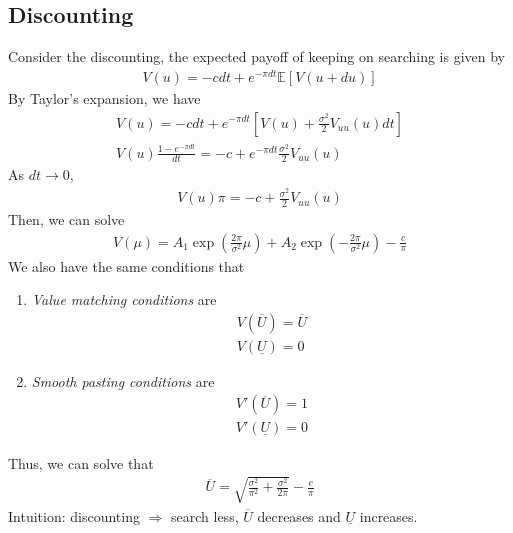\documentclass[11pt]{elegantbook}
\begin{document}
\subsection{Discounting}
Consider the discounting, the expected payoff of keeping on searching is given by
\begin{equation}
    \begin{aligned}
        V(u)=-cdt+e^{-\pi dt}\mathbb{E}[V(u+du)]
    \end{aligned}
    \nonumber
\end{equation}
By Taylor's expansion, we have
\begin{equation}
    \begin{aligned}
        V(u)=-cdt+e^{-\pi dt}[V(u)+\frac{\sigma^2}{2}V_{uu}(u)dt]\\
        V(u)\frac{1-e^{-\pi dt}}{dt}=-c+e^{-\pi dt}\frac{\sigma^2}{2}V_{uu}(u)
    \end{aligned}
    \nonumber
\end{equation}
As $dt \rightarrow 0$,
\begin{equation}
    \begin{aligned}
        V(u)\pi=-c+\frac{\sigma^2}{2}V_{uu}(u)
    \end{aligned}
    \nonumber
\end{equation}
Then, we can solve
\begin{equation}
    \begin{aligned}
        V(\mu)=A_1\exp\left(\frac{2\pi}{\sigma^2}\mu\right)+A_2\exp\left(-\frac{2\pi}{\sigma^2}\mu\right)-\frac{c}{\pi}
    \end{aligned}
    \nonumber
\end{equation}
We also have the same conditions that
\begin{enumerate}
    \item \textit{Value matching conditions} are
    \begin{equation}
        \begin{aligned}
            V(\overline{U})=\overline{U}\\
            V(\underline{U})=0
        \end{aligned}
        \nonumber
    \end{equation}
    \item \textit{Smooth pasting conditions} are
    \begin{equation}
        \begin{aligned}
            V'(\overline{U})=1\\
            V'(\underline{U})=0
        \end{aligned}
        \nonumber
    \end{equation}
\end{enumerate}
Thus, we can solve that
\begin{equation}
    \begin{aligned}
        \overline{U}=\sqrt{\frac{\sigma^2}{\pi^2}+\frac{\sigma^2}{2\pi}}-\frac{c}{\pi}
    \end{aligned}
    \nonumber
\end{equation}
Intuition: discounting $\Rightarrow$ search less, $\overline{U}$ decreases and $\underline{U}$ increases.
\end{document}
